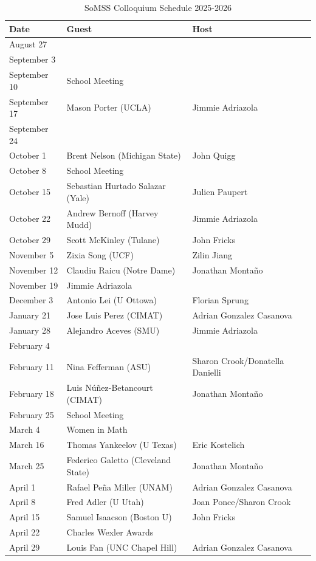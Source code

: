 \documentclass[11pt]{article}
\begin{document}
\begin{table}[htp]
\caption{SoMSS Colloquium Schedule 2025-2026}
\begin{center}
\begin{tabular}{|l|l|l|}
\hline
Date & Guest & Host\\
\hline
August 27 &&\\
September 3 &&\\
September 10 &School Meeting&\\
September 17 & Mason Porter (UCLA) & Jimmie Adriazola \\
September 24 &&\\
October 1 &Brent Nelson (Michigan State)& John Quigg \\
October 8 & School Meeting&\\
October 15 &Sebastian Hurtado Salazar (Yale)& Julien Paupert\\
October 22 & Andrew Bernoff (Harvey Mudd)& Jimmie Adriazola\\
October 29 &Scott McKinley (Tulane)& John Fricks\\
November 5 &Zixia Song (UCF)& Zilin Jiang\\
November 12 &Claudiu Raicu (Notre Dame)& Jonathan Monta\~no \\
November 19 &Jimmie Adriazola & \\
December 3 &Antonio Lei (U Ottowa) & Florian Sprung\\
January 21 & Jose Luis Perez (CIMAT)& Adrian Gonzalez Casanova \\
January 28 & Alejandro Aceves (SMU) & Jimmie Adriazola\\
February 4 && \\
February 11 & Nina Fefferman (ASU) & Sharon Crook/Donatella Danielli\\
February 18 &Luis N\'u\~nez-Betancourt (CIMAT)& Jonathan Monta\~no \\
February 25 &School Meeting& \\
March 4 &Women in Math &\\
March 16 & Thomas Yankeelov (U Texas)& Eric Kostelich\\
March 25 &Federico Galetto (Cleveland State) & Jonathan Monta\~no \\
April 1 & Rafael Pe\~na Miller (UNAM) & Adrian Gonzalez Casanova  \\
April 8 & Fred Adler (U Utah)& Joan Ponce/Sharon Crook\\ 
April 15 & Samuel Isaacson (Boston U)& John Fricks\\
April 22 & Charles Wexler Awards& \\
April 29 & Louis Fan (UNC Chapel Hill)	& Adrian Gonzalez Casanova \\
\hline
\end{tabular}
\end{center}
\end{table}%
\end{document}
